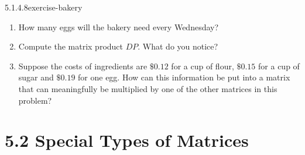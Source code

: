 \documentclass[twoside,10pt,]{book}
\numberwithin{equation}{section}
\begin{document}
\begin{divisionsolution}{5.1.4.8}{}{exercise-bakery}
\begin{enumerate}[label=(\alph*)]
\item\hypertarget{li-945}{}\hypertarget{p-1787}{}%
How many eggs will the bakery need every Wednesday?%
\item\hypertarget{li-946}{}\hypertarget{p-1788}{}%
Compute the matrix product \(D P\).   What do you notice?%
\item\hypertarget{li-947}{}\hypertarget{p-1789}{}%
Suppose the costs of ingredients are \(\$0.12\) for a cup of flour, \(\$0.15\) for a cup of sugar and \(\$0.19\) for one egg. How can this information be put into a matrix that can meaningfully be multiplied by one of the other matrices in this problem?%
\end{enumerate}
%
\end{divisionsolution}%
\section*{5.2 Special Types of Matrices}
\end{document}
